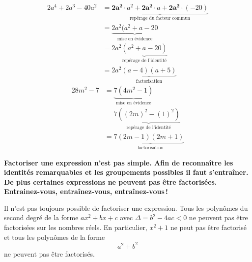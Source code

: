 \documentclass[a4paper,12pt]{report}
\begin{document}
\begin{tasks}
	\task 
	\vspace{-2em}
	\begin{align*}
		2a^4+2a^3-40a^2&=\underset{\text{repérage du facteur commun}}{\underbrace{\bm{2a^2}\cdot a^2+\bm{2a^2}\cdot a+\bm{2a^2}\cdot (-20)}}\\
			       &=\underset{\text{mise en évidence}}{\underbrace{2a^2(a^2+a-20}}\\										 &=2a^2\underset{\text{repérage de l'identité}}{\underbrace{(a^2+a-20)}}\\
			       &=2a^2\underset{\text{factorisation}}{\underbrace{(a-4)(a+5)}}
	\end{align*}
	\task 
	\vspace{-2em}
	\begin{align*}
	28m^2-7&=\underset{\text{mise en évidence}}{\underbrace{7(4m^2-1)}}\\
	       &=7\underset{\text{repérage de l'identité}}{\underbrace{((2m)^2-(1)^2)}}\\
	       &=7\underset{\text{factorisation}}{\underbrace{(2m-1)(2m+1)}}
	\end{align*}
\end{tasks}


{\bfseries Factoriser une expression n'est pas simple. Afin de reconnaître les identités remarquables et les groupements possibles il faut s'entraîner. De plus certaines expressions ne peuvent pas être factorisées. Entrainez-vous, entraînez-vous, entraînez-vous\,!}
\begin{rem}
	Il n'est pas toujours possible de factoriser une expression. Tous les polynômes du second degré de la forme $ax^2+bx+c$ avec $\Delta=b^2-4ac<0$ ne peuvent pas être factorisées sur les nombres réels. En particulier, $x^2+1$ ne peut pas être factorisé et tous les polynômes de la forme
	\[a^2+b^2\]
	ne peuvent pas être factorisés. 
\end{rem}
\end{document}
